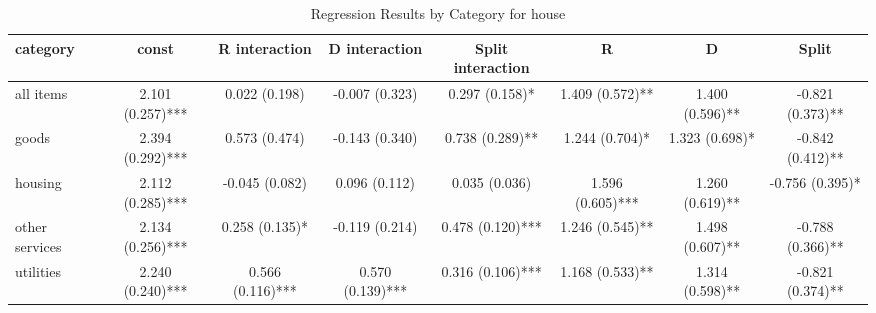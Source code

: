 \begin{table}[H]
\caption{Regression Results by Category for house}
\label{tab:regression_results}
\begin{tabular}{lccccccc}
\toprule
category & const & R interaction & D interaction & Split interaction & R & D & Split \\
\midrule
all items & 2.101 (0.257)*** & 0.022 (0.198) & -0.007 (0.323) & 0.297 (0.158)* & 1.409 (0.572)** & 1.400 (0.596)** & -0.821 (0.373)** \\
goods & 2.394 (0.292)*** & 0.573 (0.474) & -0.143 (0.340) & 0.738 (0.289)** & 1.244 (0.704)* & 1.323 (0.698)* & -0.842 (0.412)** \\
housing & 2.112 (0.285)*** & -0.045 (0.082) & 0.096 (0.112) & 0.035 (0.036) & 1.596 (0.605)*** & 1.260 (0.619)** & -0.756 (0.395)* \\
other services & 2.134 (0.256)*** & 0.258 (0.135)* & -0.119 (0.214) & 0.478 (0.120)*** & 1.246 (0.545)** & 1.498 (0.607)** & -0.788 (0.366)** \\
utilities & 2.240 (0.240)*** & 0.566 (0.116)*** & 0.570 (0.139)*** & 0.316 (0.106)*** & 1.168 (0.533)** & 1.314 (0.598)** & -0.821 (0.374)** \\
\bottomrule
\end{tabular}
\end{table}
